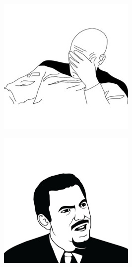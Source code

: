\begin{multicols}{8}
\begin{center}
\includegraphics[width=\linewidth]{./IMG-GIT/MEMES/Meme-Faces-18.jpg}  
\end{center}

\begin{center}
\includegraphics[width=\linewidth]{./IMG-GIT/MEMES/Meme-Faces-28.jpg}  
\end{center}


\end{multicols}
